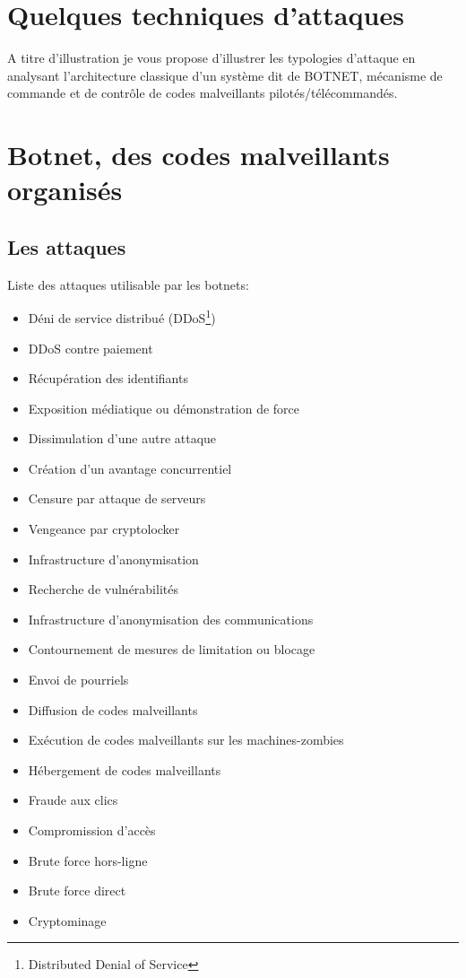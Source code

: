 %

\section{Quelques techniques d'attaques}

A titre d'illustration je vous propose d'illustrer les typologies d'attaque en analysant l'architecture classique d'un système dit de BOTNET,  mécanisme de commande et de contrôle de codes malveillants pilotés/télécommandés.

\section{Botnet, des codes malveillants organisés}

%


\subsection{Les attaques}
Liste des attaques utilisable par les botnets:
\begin{itemize}
	\item Déni de service distribué (DDoS\footnote{Distributed Denial of Service}) 
	\item DDoS contre paiement 
	\item Récupération des identifiants
	\item Exposition médiatique ou démonstration de force 
	\item Dissimulation d’une autre attaque
	\item Création d’un avantage concurrentiel 
	\item Censure par attaque de serveurs
	\item Vengeance par cryptolocker
	\item Infrastructure d’anonymisation 
	\item Recherche de vulnérabilités
	\item Infrastructure d’anonymisation des communications
	\item Contournement de mesures de limitation ou blocage 
	\item Envoi de pourriels 
	\item Diffusion de codes malveillants
	\item Exécution de codes malveillants sur les machines-zombies
	\item Hébergement de codes malveillants 
	\item Fraude aux clics 
	\item Compromission d’accès 
	\item Brute force hors-ligne
	\item Brute force direct 
	\item Cryptominage 
\end{itemize}

